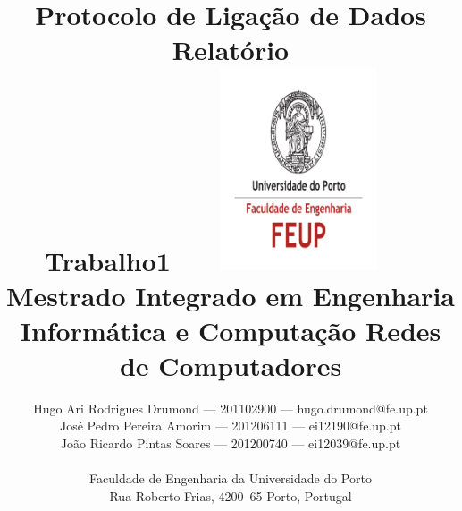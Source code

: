 \documentclass[a4paper]{article}
\begin{document}
\setlength{\textwidth}{16cm}
\setlength{\textheight}{22cm}

\title{\Huge\textbf{Protocolo de Ligação de Dados}\linebreak\linebreak\linebreak
\Large\textbf{Relatório \\ Trabalho1}\linebreak\linebreak
\includegraphics[height=6cm, width=7cm]{feup.pdf}\linebreak \linebreak
\Large{Mestrado Integrado em Engenharia Informática e Computação} \linebreak \linebreak
\Large{Redes de Computadores}
}

\author{Hugo Ari Rodrigues Drumond --- 201102900 --- hugo.drumond@fe.up.pt \\ José Pedro Pereira Amorim --- 201206111 --- ei12190@fe.up.pt \\ João Ricardo Pintas Soares --- 201200740 --- ei12039@fe.up.pt\linebreak\linebreak\linebreak \\
 \\ Faculdade de Engenharia da Universidade do Porto \\ Rua Roberto Frias, 4200--65 Porto, Portugal \linebreak\linebreak\linebreak
\linebreak\linebreak\vspace{1cm}}
\maketitle
\thispagestyle{empty}
\end{document}
